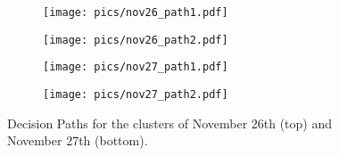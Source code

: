 \documentclass[manuscript, nonacm]{acmart}
\begin{document}
\begin{figure}[t]
\centering

\begin{subfigure}[b]{.48\linewidth}\centering
\texttt{[image: pics/nov26\_path1.pdf]}
\end{subfigure}
\begin{subfigure}[b]{.48\linewidth}\centering
\texttt{[image: pics/nov26\_path2.pdf]}
\end{subfigure}

\vspace*{-12pt}

\begin{subfigure}[b]{.48\linewidth}\centering
\texttt{[image: pics/nov27\_path1.pdf]}
\end{subfigure}
\begin{subfigure}[b]{.48\linewidth}\centering
\texttt{[image: pics/nov27\_path2.pdf]}
\end{subfigure}

\vspace*{-12pt}

\caption{Decision Paths for the clusters of November 26th (top) and November 27th (bottom).}
\label{fig:dpaths}
\end{figure}
\end{document}
